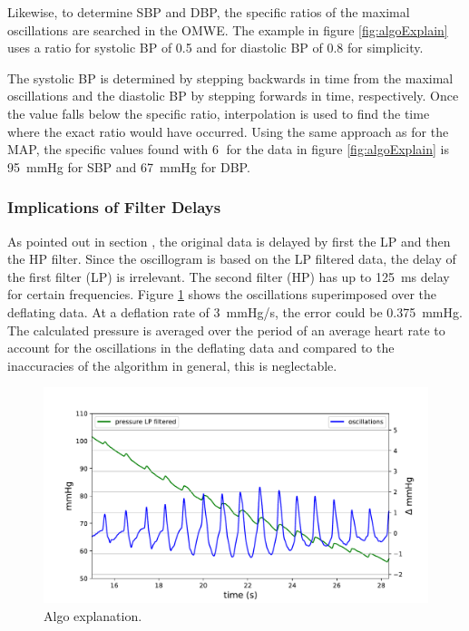 Likewise, to determine SBP and DBP, the specific ratios of the maximal oscillations are searched in the OMWE. The example in figure \ref{fig:algoExplain} uses a ratio for systolic BP of 0.5 and for diastolic BP of 0.8 for simplicity.

The systolic BP is determined by stepping backwards in time from the maximal oscillations and the diastolic BP by stepping forwards in time, respectively. Once the value falls below the specific ratio, interpolation is used to find the time where the exact ratio would have occurred. Using the same approach as for the MAP, the specific values found with \textcircled{6} for the data in figure \ref{fig:algoExplain} is \SI{95}{\mmHg} for SBP and \SI{67}{\mmHg} for DBP.

\subsubsection{Implications of Filter Delays}\label{sec:impfilt}
As pointed out in section , the original data is delayed by first the LP and then the HP filter. Since the oscillogram is based on the LP filtered data, the delay of the first filter (LP) is irrelevant. The second filter (HP) has up to \SI{125}{\milli\second} delay for certain frequencies. Figure \ref{fig:algoDetail} shows the oscillations superimposed over the deflating data. At a deflation rate of \SI{3}{\mmHg/\second}, the error could be \SI{0.375}{\mmHg}. The calculated pressure is averaged over the period of an average heart rate to account for the oscillations in the deflating data and compared to the inaccuracies of the algorithm in general, this is neglectable. 


\begin{figure}[ht]
\centering
\includegraphics[width=\textwidth]{figures/algo_detail.pdf}
\caption{Algo explanation.}
\label{fig:algoDetail}
\end{figure}
